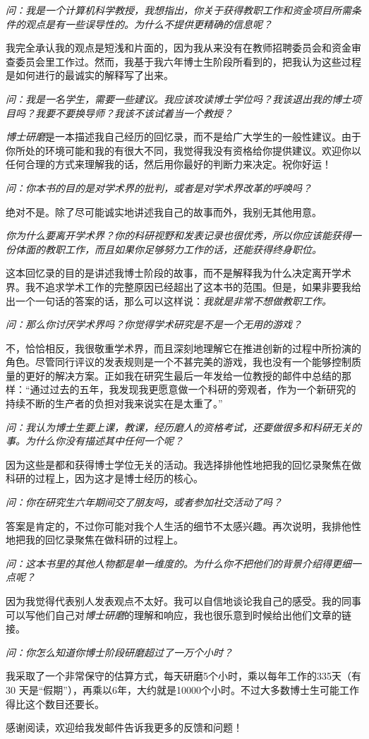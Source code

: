 \documentclass[letter,12pt]{book}
\newcommand{\bookname}{博士研磨}
\begin{document}
\begin{CJK}{UTF8}{gbsn}
\emph{问：我是一个计算机科学教授，我想指出，你关于获得教职工作和资金项目所需条件的观点是有一些误导性的。为什么不提供更精确的信息呢？}

我完全承认我的观点是短浅和片面的，因为我从来没有在教师招聘委员会和资金审查委员会里工作过。然而，我基于我六年博士生阶段所看到的，把我认为这些过程是如何进行的最诚实的解释写了出来。

\emph{问：我是一名学生，需要一些建议。我应该攻读博士学位吗？我该退出我的博士项目吗？我要不要换导师？我该不该试着当一个教授？}

\emph{\bookname}是一本描述我自己经历的回忆录，而不是给广大学生的一般性建议。由于你所处的环境可能和我的有很大不同，我觉得我没有资格给你提供建议。欢迎你以任何合理的方式来理解我的话，然后用你最好的判断力来决定。祝你好运！

\emph{问：你本书的目的是对学术界的批判，或者是对学术界改革的呼唤吗？}

绝对不是。除了尽可能诚实地讲述我自己的故事而外，我别无其他用意。

\emph{你为什么要离开学术界？你的科研视野和发表记录也很优秀，所以你应该能获得一份体面的教职工作，而且如果你足够努力工作的话，还能获得终身职位。}

这本回忆录的目的是讲述我博士阶段的故事，而不是解释我为什么决定离开学术界。我不追求学术工作的完整原因已经超出了这本书的范围。但是，如果非要我给出一个一句话的答案的话，那么可以这样说：\emph{我就是非常不想做教职工作。}

\emph{问：那么你讨厌学术界吗？你觉得学术研究是不是一个无用的游戏？}

不，恰恰相反，我很敬重学术界，而且深刻地理解它在推进创新的过程中所扮演的角色。尽管同行评议的发表规则是一个不甚完美的游戏，我也没有一个能够控制质量的更好的解决方案。正如我在研究生最后一年发给一位教授的邮件中总结的那样：“通过过去的五年，我发现我更愿意做一个科研的旁观者，作为一个新研究的持续不断的生产者的负担对我来说实在是太重了。”

\emph{问：我认为博士生要上课，教课，经历磨人的资格考试，还要做很多和科研无关的事。为什么你没有描述其中任何一个呢？}

因为这些是都和获得博士学位无关的活动。我选择排他性地把我的回忆录聚焦在做科研的过程上，因为这才是博士经历的核心。

\emph{问：你在研究生六年期间交了朋友吗，或者参加社交活动了吗？}

答案是肯定的，不过你可能对我个人生活的细节不太感兴趣。再次说明，我排他性地把我的回忆录聚焦在做科研的过程上。

\emph{问：这本书里的其他人物都是单一维度的。为什么你不把他们的背景介绍得更细一点呢？}

因为我觉得代表别人发表观点不太好。我可以自信地谈论我自己的感受。我的同事可以写他们自己对\emph{\bookname}的理解和响应，我也很乐意到时候给出他们文章的链接。

\emph{问：你怎么知道你博士阶段研磨超过了一万个小时？}

我采取了一个非常保守的估算方式，每天研磨5个小时，乘以每年工作的335天（有30 天是“假期”），再乘以6年，大约就是10000个小时。不过大多数博士生可能工作得比这个数目还要长。

感谢阅读，欢迎给我发邮件告诉我更多的反馈和问题！

\clearpage
\clearpage

\end{CJK}
\end{document}
